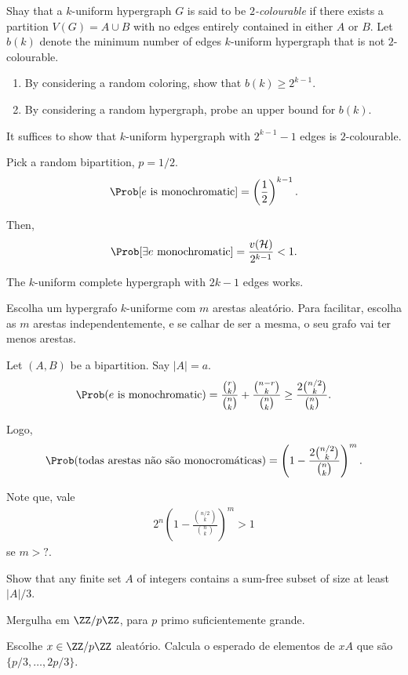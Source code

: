 \documentclass[10pt, a4paper]{article}
\begin{document}
\begin{prob}
	Shay that a $k$-uniform hypergraph $G$ is said to be \emph{$2$-colourable} if there exists a partition $V(G) = A \cup B$ with no edges entirely contained in either $A$ or $B$. Let $b(k)$ denote the minimum number of edges $k$-uniform hypergraph that is not $2$-colourable.
	\begin{enumerate}[label = (\alph*)]
		\item By considering a random coloring, show that $b(k) \ge 2^{k-1}$.
		\item By considering a random hypergraph, probe an upper bound for $b(k)$.
	\end{enumerate}
\end{prob}
\begin{sk}[for (a)]
	It suffices to show that $k$-uniform hypergraph with $2^{k-1} - 1$ edges is $2$-colourable.

	Pick a random bipartition, $p = 1/2$. \[
		\Prob[e \text{ is monochromatic}] = \left(\frac{1}{2}\right)^{k-1}.
	\]

	Then, \[
		\Prob[\exists e \text{ monochromatic}] = \frac{v(\mathcal H)}{2^{k-1}} < 1.
	\]
\end{sk}
\begin{sk}
	The $k$-uniform complete hypergraph with $2k-1$ edges works.
\end{sk}
\begin{sk}[for (b)]
	Escolha um hypergrafo $k$-uniforme com $m$ arestas aleatório. Para facilitar, escolha as $m$ arestas independentemente, e se calhar de ser a mesma, o seu grafo vai ter menos arestas.

	Let $(A, B)$ be a bipartition. Say $|A| = a$. 
	 \begin{equation*}
		 \Prob(e \text{ is monochromatic}) = \frac{\binom{r}{k}}{\binom{n}{k}} + \frac{\binom{n-r}{k}}{\binom{n}{k}} \ge \frac{2\binom{n/2}{k}}{\binom{n}{k}}.
	\end{equation*}

	Logo, \[
		\Prob(\text{todas arestas não são monocromáticas}) = \left( 1 - \frac{2\binom{n/2}{k}}{\binom{n}{k}}\right)^m.
	\]

	Note que, vale
	\begin{align*}
		2^n \left(1 - \frac{\binom{n/2}{k}}{\binom{n}{k}}\right)^m > 1
	\end{align*}
	se $m > ?$.
\end{sk}

\begin{prob}
	Show that any finite set $A$ of integers contains a sum-free subset of size at least $|A|/3$.
\end{prob}
\begin{sol}
	Mergulha em $\ZZ/p\ZZ$, para $p$ primo suficientemente grande.

	Escolhe $x \in \ZZ/p\ZZ$ aleatório. Calcula o esperado de elementos de $xA$ que são $\{p/3, \dots, 2p/3\}$.
\end{sol}
\end{document}
